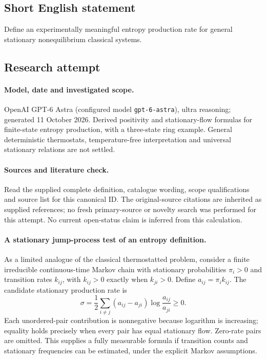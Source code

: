 \documentclass[11pt]{article}
\begin{document}
\subsection{Short English statement}
Define an experimentally meaningful entropy production rate for general stationary nonequilibrium classical systems.
\subsection{Research attempt}
\paragraph{Model, date and investigated scope.}
OpenAI GPT-6 Astra (configured model \texttt{gpt-6-astra}), ultra reasoning; generated 11 October 2026. Derived positivity and stationary-flow formulas for finite-state entropy production, with a three-state ring example. General deterministic thermostats, temperature-free interpretation and universal stationary relations are not settled.

\paragraph{Sources and literature check.}
Read the supplied complete definition, catalogue wording, scope qualifications and source list for this canonical ID. The original-source citations are inherited as supplied references; no fresh primary-source or novelty search was performed for this attempt. No current open-status claim is inferred from this calculation.

\paragraph{A stationary jump-process test of an entropy definition.}As a limited analogue of the classical thermostatted problem, consider a finite irreducible continuous-time Markov chain with stationary probabilities \(\pi_i>0\) and transition rates \(k_{ij}\), with \(k_{ij}>0\) exactly when \(k_{ji}>0\). Define \(a_{ij}=\pi_i k_{ij}\). The candidate stationary production rate is
\[\sigma=\frac12\sum_{i\ne j}(a_{ij}-a_{ji})\log\frac{a_{ij}}{a_{ji}}\ge0.\]
Each unordered-pair contribution is nonnegative because logarithm is increasing; equality holds precisely when every pair has equal stationary flow. Zero-rate pairs are omitted. This supplies a fully measurable formula if transition counts and stationary frequencies can be estimated, under the explicit Markov assumptions.
\end{document}
